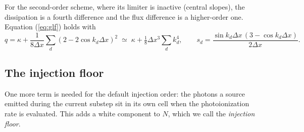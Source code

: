 \documentclass[11pt]{article}
\newcommand{\dx}{\Delta x}
\begin{document}
\begin{enumerate}
For the second-order scheme, where its limiter is inactive (central slopes), the dissipation is a fourth
difference and the flux difference is a higher-order one. Equation (\ref{eq:glf}) holds with
\begin{equation}
q=\kappa+\frac{1}{8\dx}\sum_d(2-2\cos k_d\dx)^2\;\simeq\;\kappa+\tfrac18\dx^3\sum_dk_d^4,\qquad
s_d=\frac{\sin k_d\dx\,(3-\cos k_d\dx)}{2\dx}.\label{eq:muscl}
\end{equation}
\end{enumerate}

\subsection{The injection floor}\label{sec:floor}

One more term is needed for the default injection order: the photons a source emitted during the
current substep sit in its own cell when the photoionization rate is evaluated. This adds a white
component to $N$, which we call the \emph{injection floor}.
\end{document}
